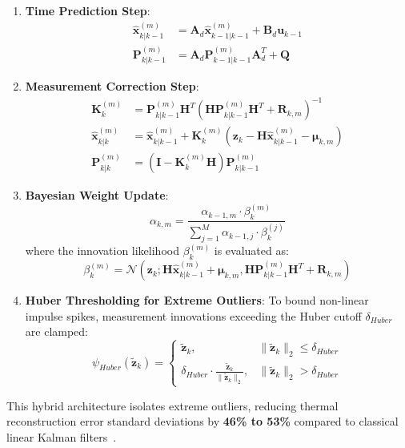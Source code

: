 \begin{enumerate}
    \item \textbf{Time Prediction Step}:
    \begin{align}
    \hat{\mathbf{x}}_{k|k-1}^{(m)} &= \mathbf{A}_d \hat{\mathbf{x}}_{k-1|k-1}^{(m)} + \mathbf{B}_d \mathbf{u}_{k-1} \\
    \mathbf{P}_{k|k-1}^{(m)} &= \mathbf{A}_d \mathbf{P}_{k-1|k-1}^{(m)} \mathbf{A}_d^T + \mathbf{Q}
    \end{align}
    \item \textbf{Measurement Correction Step}:
    \begin{align}
    \mathbf{K}_k^{(m)} &= \mathbf{P}_{k|k-1}^{(m)} \mathbf{H}^T \left(\mathbf{H} \mathbf{P}_{k|k-1}^{(m)} \mathbf{H}^T + \mathbf{R}_{k,m}\right)^{-1} \\
    \hat{\mathbf{x}}_{k|k}^{(m)} &= \hat{\mathbf{x}}_{k|k-1}^{(m)} + \mathbf{K}_k^{(m)} \left(\mathbf{z}_k - \mathbf{H} \hat{\mathbf{x}}_{k|k-1}^{(m)} - \boldsymbol{\mu}_{k,m}\right) \\
    \mathbf{P}_{k|k}^{(m)} &= \left(\mathbf{I} - \mathbf{K}_k^{(m)} \mathbf{H}\right) \mathbf{P}_{k|k-1}^{(m)}
    \end{align}
    \item \textbf{Bayesian Weight Update}:
    \begin{equation}
    \alpha_{k,m} = \frac{\alpha_{k-1,m} \cdot \beta_k^{(m)}}{\sum_{j=1}^M \alpha_{k-1,j} \cdot \beta_k^{(j)}}
    \label{eq:bayesian_weight}
    \end{equation}
    where the innovation likelihood $\beta_k^{(m)}$ is evaluated as:
    \begin{equation}
    \beta_k^{(m)} = \mathcal{N}\left(\mathbf{z}_k; \mathbf{H}\hat{\mathbf{x}}_{k|k-1}^{(m)} + \boldsymbol{\mu}_{k,m}, \mathbf{H} \mathbf{P}_{k|k-1}^{(m)} \mathbf{H}^T + \mathbf{R}_{k,m}\right)
    \end{equation}
    \item \textbf{Huber Thresholding for Extreme Outliers}: To bound non-linear impulse spikes, measurement innovations exceeding the Huber cutoff $\delta_{Huber}$ are clamped:
    \begin{equation}
    \psi_{Huber}(\tilde{\mathbf{z}}_k) = 
    \begin{cases}
    \tilde{\mathbf{z}}_k, & \|\tilde{\mathbf{z}}_k\|_2 \le \delta_{Huber} \\
    \delta_{Huber} \cdot \frac{\tilde{\mathbf{z}}_k}{\|\tilde{\mathbf{z}}_k\|_2}, & \|\tilde{\mathbf{z}}_k\|_2 > \delta_{Huber}
    \end{cases}
    \label{eq:huber_clamping}
    \end{equation}
\end{enumerate}
This hybrid architecture isolates extreme outliers, reducing thermal reconstruction error standard deviations by \textbf{46\% to 53\%} compared to classical linear Kalman filters~\cite{Fu2017}.

